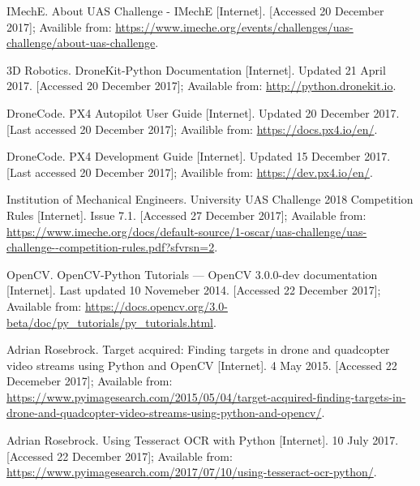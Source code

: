\documentclass[11pt]{article}
\begin{document}
{\small
\newpage
\begin{thebibliography}{11}

        IMechE. About UAS Challenge - IMechE [Internet]. [Accessed 20 December 2017]; Availible from: \url{https://www.imeche.org/events/challenges/uas-challenge/about-uas-challenge}.

        3D Robotics. DroneKit-Python Documentation [Internet]. Updated 21 April 2017. [Accessed 20 December 2017]; Available from: \url{http://python.dronekit.io}.

        DroneCode. PX4 Autopilot User Guide [Internet]. Updated 20 December 2017. [Last accessed 20 December 2017]; Availible from: \url{https://docs.px4.io/en/}.

        DroneCode. PX4 Development Guide [Internet]. Updated 15 December 2017. [Last accessed 20 December 2017]; Availible from: \url{https://dev.px4.io/en/}.

        Institution of Mechanical Engineers. University UAS Challenge 2018 Competition Rules [Internet]. Issue 7.1. [Accessed 27 December 2017]; Available from: \url{https://www.imeche.org/docs/default-source/1-oscar/uas-challenge/uas-challenge--competition-rules.pdf?sfvrsn=2}.

        OpenCV. OpenCV-Python Tutorials — OpenCV 3.0.0-dev documentation [Internet]. Last updated 10 Novemeber 2014. [Accessed 22 December 2017]; Available from: \url{https://docs.opencv.org/3.0-beta/doc/py_tutorials/py_tutorials.html}.

        Adrian Rosebrock. Target acquired: Finding targets in drone and quadcopter video streams using Python and OpenCV [Internet]. 4 May 2015. [Accessed 22 Decemeber 2017]; Available from: \url{https://www.pyimagesearch.com/2015/05/04/target-acquired-finding-targets-in-drone-and-quadcopter-video-streams-using-python-and-opencv/}.

        Adrian Rosebrock. Using Tesseract OCR with Python [Internet]. 10 July 2017. [Accessed 22 December 2017]; Available from: \url{https://www.pyimagesearch.com/2017/07/10/using-tesseract-ocr-python/}.

\end{thebibliography}}
\end{document}

